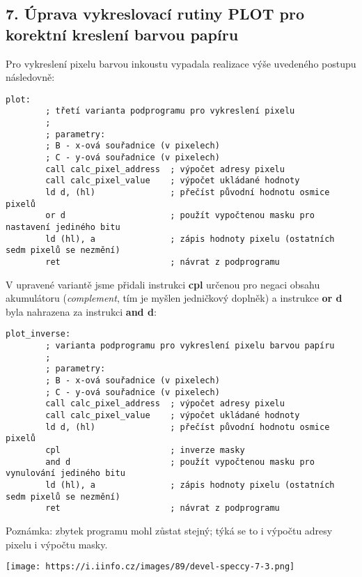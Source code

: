 \documentclass{article}
\renewcommand\includegraphics[2][]{}
\begin{document}
\hypertarget{k07}{%
\subsection{\texorpdfstring{7. Úprava vykreslovací rutiny \textbf{PLOT}
pro korektní kreslení barvou
papíru}{7. Úprava vykreslovací rutiny PLOT pro korektní kreslení barvou papíru}}\label{k07}}

Pro vykreslení pixelu barvou inkoustu vypadala realizace výše uvedeného
postupu následovně:

\begin{verbatim}
plot:
        ; třetí varianta podprogramu pro vykreslení pixelu
        ;
        ; parametry:
        ; B - x-ová souřadnice (v pixelech)
        ; C - y-ová souřadnice (v pixelech)
        call calc_pixel_address  ; výpočet adresy pixelu
        call calc_pixel_value    ; výpočet ukládané hodnoty
        ld d, (hl)               ; přečíst původní hodnotu osmice pixelů
        or d                     ; použít vypočtenou masku pro nastavení jediného bitu
        ld (hl), a               ; zápis hodnoty pixelu (ostatních sedm pixelů se nezmění)
        ret                      ; návrat z podprogramu
\end{verbatim}

V upravené variantě jsme přidali instrukci \textbf{cpl} určenou pro
negaci obsahu akumulátoru (\emph{complement}, tím je myšlen jedničkový
doplněk) a instrukce \textbf{or d} byla nahrazena za instrukci
\textbf{and d}:

\begin{verbatim}
plot_inverse:
        ; varianta podprogramu pro vykreslení pixelu barvou papíru
        ;
        ; parametry:
        ; B - x-ová souřadnice (v pixelech)
        ; C - y-ová souřadnice (v pixelech)
        call calc_pixel_address  ; výpočet adresy pixelu
        call calc_pixel_value    ; výpočet ukládané hodnoty
        ld d, (hl)               ; přečíst původní hodnotu osmice pixelů
        cpl                      ; inverze masky
        and d                    ; použít vypočtenou masku pro vynulování jediného bitu
        ld (hl), a               ; zápis hodnoty pixelu (ostatních sedm pixelů se nezmění)
        ret                      ; návrat z podprogramu
\end{verbatim}

Poznámka: zbytek programu mohl zůstat stejný; týká se to i výpočtu
adresy pixelu i výpočtu masky.

\texttt{[image: https://i.iinfo.cz/images/89/devel-speccy-7-3.png]}
\end{document}
